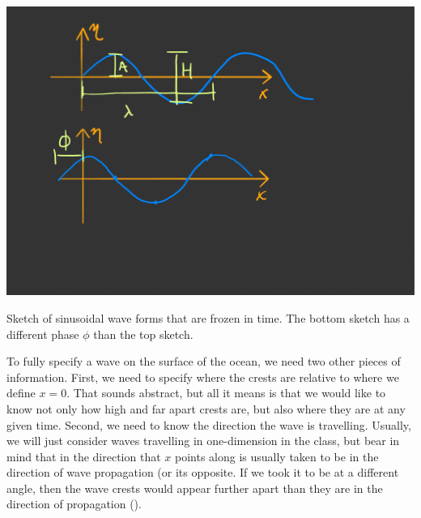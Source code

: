 \begin{marginfigure}
  \includegraphics{figs/Waves/SketchDefnX}
    \caption{Sketch of sinusoidal wave forms that are frozen in time. The bottom sketch has a different phase $\phi$ than the top sketch. }
    \label{fig:SketchDefnX}  
\end{marginfigure}

To fully specify a wave on the surface of the ocean, we need two other pieces of information.  First, we need to specify where the crests are relative to where we define $x=0$.  That sounds abstract, but all it means is that we would like to know not only how high and far apart crests are, but also where they are at any given time.  Second, we need to know the direction the wave is travelling.  Usually, we will just consider waves travelling in one-dimension in the class, but bear in mind that in  the direction that $x$ points along is usually taken to be in the direction of wave propagation (or its opposite.  If we took it to be at a different angle, then the wave crests would appear further apart than they are in the direction of propagation ().    

